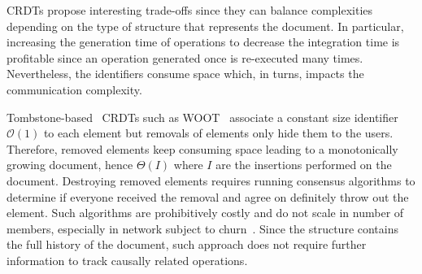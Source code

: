 \begin{asparadesc}
  CRDTs propose interesting trade-offs since they can balance complexities
  depending on the type of structure that represents the document.  In
  particular, increasing the generation time of operations to decrease the
  integration time is profitable since an operation generated once is
  re-executed many times. Nevertheless, the identifiers consume space which, in
  turns, impacts the communication complexity.

\item [Tombstone-based~\cite{ahmed2011evaluating, conway2014language,
    grishchenko2010deep, oster2006data, roh2011replicated, weiss2007wooki,
    wu2010partial, yu2012stringwise}] CRDTs such as WOOT~\cite{oster2006data}
  associate a constant size identifier $\mathcal{O}(1)$ to each element but
  removals of elements only hide them to the users. Therefore, removed elements
  keep consuming space leading to a monotonically growing document, hence
  $\Theta(I)$ where $I$ are the insertions performed on the document.  Destroying
  removed elements requires running consensus algorithms to determine if
  everyone received the removal and agree on definitely throw out the
  element. Such algorithms are prohibitively costly and do not scale in number
  of members, especially in network subject to
  churn~\cite{mostefaoui2015signature}. Since the structure contains the full
  history of the document, such approach does not require further information to
  track causally related operations.


\end{asparadesc}
